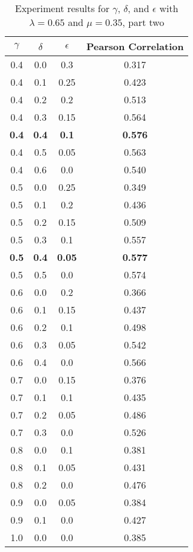 \documentclass{article}
\begin{document}
\begin{table}[h!]
\centering
\begin{tabular}{|c|c|c||c|}
	\hline
	$\gamma$ & $\delta$ & $\epsilon$ & Pearson Correlation \\
	\hline
	\hline
	0.4 & 0.0 & 0.3 & 0.317 \\
	0.4 & 0.1 & 0.25 & 0.423 \\
	0.4 & 0.2 & 0.2 & 0.513 \\
	0.4 & 0.3 & 0.15 & 0.564 \\
	\textbf{0.4} & \textbf{0.4} & \textbf{0.1} & \textbf{0.576} \\
	0.4 & 0.5 & 0.05 & 0.563 \\
	0.4 & 0.6 & 0.0 & 0.540 \\
	\hline
	0.5 & 0.0 & 0.25 & 0.349 \\
	0.5 & 0.1 & 0.2 & 0.436 \\
	0.5 & 0.2 & 0.15 & 0.509 \\
	0.5 & 0.3 & 0.1 & 0.557 \\
	\textbf{0.5} & \textbf{0.4} & \textbf{0.05} & \textbf{0.577} \\
	0.5 & 0.5 & 0.0 & 0.574 \\
	\hline
	0.6 & 0.0 & 0.2 & 0.366 \\
	0.6 & 0.1 & 0.15 & 0.437 \\
	0.6 & 0.2 & 0.1 & 0.498 \\
	0.6 & 0.3 & 0.05 & 0.542 \\
	0.6 & 0.4 & 0.0 & 0.566 \\
	\hline
	0.7 & 0.0 & 0.15 & 0.376 \\
	0.7 & 0.1 & 0.1 & 0.435 \\
	0.7 & 0.2 & 0.05 & 0.486 \\
	0.7 & 0.3 & 0.0 & 0.526 \\
	\hline
	0.8 & 0.0 & 0.1 & 0.381 \\
	0.8 & 0.1 & 0.05 & 0.431 \\
	0.8 & 0.2 & 0.0 & 0.476 \\
	\hline
	0.9 & 0.0 & 0.05 & 0.384 \\
	0.9 & 0.1 & 0.0 & 0.427 \\
	\hline
	1.0 & 0.0 & 0.0 & 0.385 \\
	\hline
\end{tabular}
\caption{Experiment results for $\gamma$, $\delta$, and $\epsilon$ with $\lambda = 0.65$ and $\mu = 0.35$, part two}
\label{table:gammaresults2}
\end{table}
\end{document}
